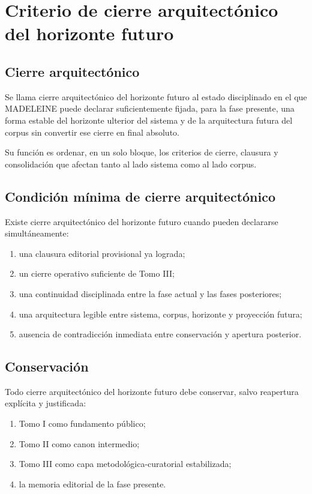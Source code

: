 \chapter{Criterio de cierre arquitectónico del horizonte futuro}

\section{Cierre arquitectónico}
\begin{definition}
Se llama cierre arquitectónico del horizonte futuro al estado disciplinado en el que MADELEINE puede declarar suficientemente fijada, para la fase presente, una forma estable del horizonte ulterior del sistema y de la arquitectura futura del corpus sin convertir ese cierre en final absoluto.
\end{definition}

\begin{observation}
Su función es ordenar, en un solo bloque, los criterios de cierre, clausura y consolidación que afectan tanto al lado sistema como al lado corpus.
\end{observation}

\section{Condición mínima de cierre arquitectónico}
\begin{definition}
Existe cierre arquitectónico del horizonte futuro cuando pueden declararse simultáneamente:
\begin{enumerate}
  \item una clausura editorial provisional ya lograda;
  \item un cierre operativo suficiente de Tomo III;
  \item una continuidad disciplinada entre la fase actual y las fases posteriores;
  \item una arquitectura legible entre sistema, corpus, horizonte y proyección futura;
  \item ausencia de contradicción inmediata entre conservación y apertura posterior.
\end{enumerate}
\end{definition}

\section{Conservación}
\begin{definition}
Todo cierre arquitectónico del horizonte futuro debe conservar, salvo reapertura explícita y justificada:
\begin{enumerate}
  \item Tomo I como fundamento público;
  \item Tomo II como canon intermedio;
  \item Tomo III como capa metodológica-curatorial estabilizada;
  \item la memoria editorial de la fase presente.
\end{enumerate}
\end{definition}


